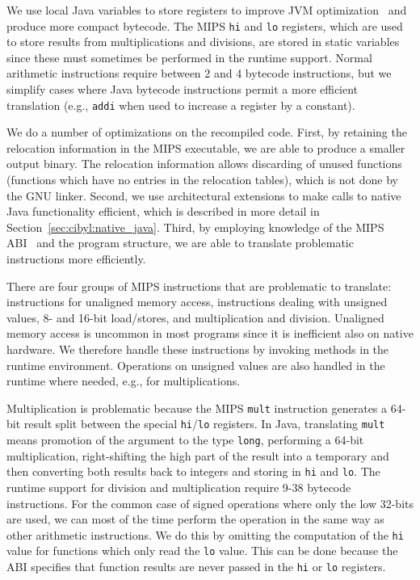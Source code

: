 We use local Java variables to store registers to improve JVM
optimization~\cite{budimlic97optimizing} and produce more compact bytecode.
The MIPS \texttt{hi} and \texttt{lo} registers, which are used to store
results from multiplications and divisions, are stored in static variables
since these must sometimes be performed in the runtime support. Normal
arithmetic instructions require between 2 and 4 bytecode instructions, but we
simplify cases where Java bytecode instructions permit a more efficient
translation (e.g., \texttt{addi} when used to increase a register by a
constant).


We do a number of optimizations on the recompiled code. First, by retaining
the relocation information in the MIPS executable, we are able to produce a
smaller output binary. The relocation information allows discarding of unused
functions (functions which have no entries in the relocation tables), which is
not done by the GNU linker. Second, we use architectural extensions to make
calls to native Java functionality efficient, which is described in more
detail in Section~\ref{sec:cibyl:native_java}. Third, by employing knowledge of the
MIPS ABI~\cite{sco96mipsabi} and the program structure, we are able to
translate problematic instructions more efficiently.

There are four groups of MIPS instructions that are problematic to translate:
instructions for unaligned memory access, instructions dealing with unsigned
values, 8- and 16-bit load/stores, and multiplication and division.  Unaligned
memory access is uncommon in most programs since it is inefficient also on
native hardware. We therefore handle these instructions by invoking methods in
the runtime environment. Operations on unsigned values are also handled in the
runtime where needed, e.g., for multiplications.

Multiplication is problematic because the MIPS \texttt{mult} instruction
generates a 64-bit result split between the special \texttt{hi}/\texttt{lo}
registers. In Java, translating \texttt{mult} means promotion of the argument
to the type \texttt{long}, performing a 64-bit multiplication,
right-shifting the high part of the result into a temporary and then
converting both results back to integers and storing in \texttt{hi} and
\texttt{lo}. The runtime support for division and multiplication require 9-38
bytecode instructions. For the common case of signed operations where only the
low 32-bits are used, we can most of the time perform the operation in the
same way as other arithmetic instructions. We do this by omitting the
computation of the \texttt{hi} value for functions which only read the
\texttt{lo} value. This can be done because the ABI specifies that function
results are never passed in the \texttt{hi} or \texttt{lo} registers.


